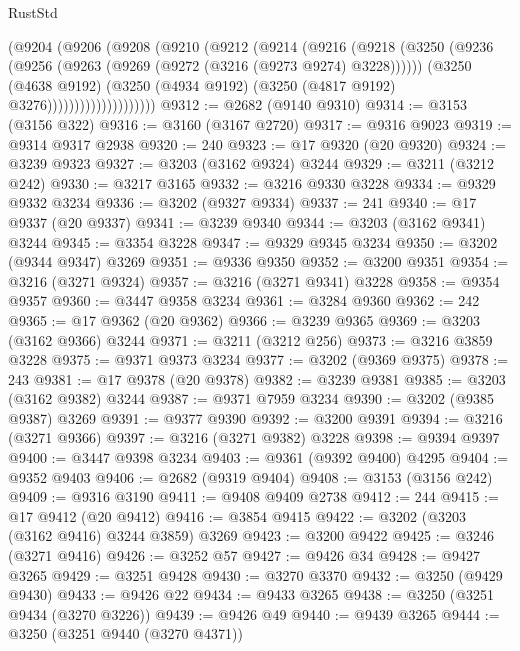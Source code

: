 \begin{lexlean}{RustStd}
\begin{coremodule}
                    (@9204
                      (@9206
                        (@9208
                          (@9210
                            (@9212
                              (@9214
                                (@9216
                                  (@9218
                                    (@3250
                                      (@9236
                                        (@9256 (@9263 (@9269 (@9272 (@3216 (@9273 @9274) @3228))))))
                                      (@3250
                                        (@4638 @9192)
                                        (@3250
                                          (@4934 @9192)
                                          (@3250 (@4817 @9192) @3276))))))))))))))))))))
@9312 := @2682 (@9140 @9310)
@9314 := @3153 (@3156 @322)
@9316 := @3160 (@3167 @2720)
@9317 := @9316 @9023
@9319 := @9314 @9317 @2938
@9320 := 240
@9323 := @17 @9320 (@20 @9320)
@9324 := @3239 @9323
@9327 := @3203 (@3162 @9324) @3244
@9329 := @3211 (@3212 @242)
@9330 := @3217 @3165
@9332 := @3216 @9330 @3228
@9334 := @9329 @9332 @3234
@9336 := @3202 (@9327 @9334)
@9337 := 241
@9340 := @17 @9337 (@20 @9337)
@9341 := @3239 @9340
@9344 := @3203 (@3162 @9341) @3244
@9345 := @3354 @3228
@9347 := @9329 @9345 @3234
@9350 := @3202 (@9344 @9347) @3269
@9351 := @9336 @9350
@9352 := @3200 @9351
@9354 := @3216 (@3271 @9324)
@9357 := @3216 (@3271 @9341) @3228
@9358 := @9354 @9357
@9360 := @3447 @9358 @3234
@9361 := @3284 @9360
@9362 := 242
@9365 := @17 @9362 (@20 @9362)
@9366 := @3239 @9365
@9369 := @3203 (@3162 @9366) @3244
@9371 := @3211 (@3212 @256)
@9373 := @3216 @3859 @3228
@9375 := @9371 @9373 @3234
@9377 := @3202 (@9369 @9375)
@9378 := 243
@9381 := @17 @9378 (@20 @9378)
@9382 := @3239 @9381
@9385 := @3203 (@3162 @9382) @3244
@9387 := @9371 @7959 @3234
@9390 := @3202 (@9385 @9387) @3269
@9391 := @9377 @9390
@9392 := @3200 @9391
@9394 := @3216 (@3271 @9366)
@9397 := @3216 (@3271 @9382) @3228
@9398 := @9394 @9397
@9400 := @3447 @9398 @3234
@9403 := @9361 (@9392 @9400) @4295
@9404 := @9352 @9403
@9406 := @2682 (@9319 @9404)
@9408 := @3153 (@3156 @242)
@9409 := @9316 @3190
@9411 := @9408 @9409 @2738
@9412 := 244
@9415 := @17 @9412 (@20 @9412)
@9416 := @3854 @9415
@9422 := @3202 (@3203 (@3162 @9416) @3244 @3859) @3269
@9423 := @3200 @9422
@9425 := @3246 (@3271 @9416)
@9426 := @3252 @57
@9427 := @9426 @34
@9428 := @9427 @3265
@9429 := @3251 @9428
@9430 := @3270 @3370
@9432 := @3250 (@9429 @9430)
@9433 := @9426 @22
@9434 := @9433 @3265
@9438 := @3250 (@3251 @9434 (@3270 @3226))
@9439 := @9426 @49
@9440 := @9439 @3265
@9444 := @3250 (@3251 @9440 (@3270 @4371))

\end{coremodule}
\end{lexlean}
